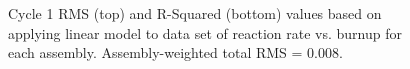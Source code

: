 \begin{figure}[htbp]
{\begin{tikzpicture}[x=1in,y=1in]
      \end{tikzpicture}
    }
    


    \caption{Cycle 1 RMS (top) and R-Squared (bottom) values based on applying linear model to data set of reaction rate vs. burnup for each assembly. Assembly-weighted total RMS = 0.008. \label{fig:cyc1_lm_eighth_map}}
\end{figure}

